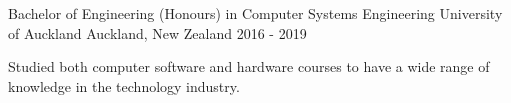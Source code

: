 

\begin{cventries}

  \cventry
    {Bachelor of Engineering (Honours) in Computer Systems Engineering} %
    {University of Auckland} %
    {Auckland, New Zealand} %
    {2016 - 2019} %
    {
      \begin{cvitems} %
        \item {Studied both computer software and hardware courses to have a wide range of knowledge in the technology industry.}
      \end{cvitems}
    }

\end{cventries}
